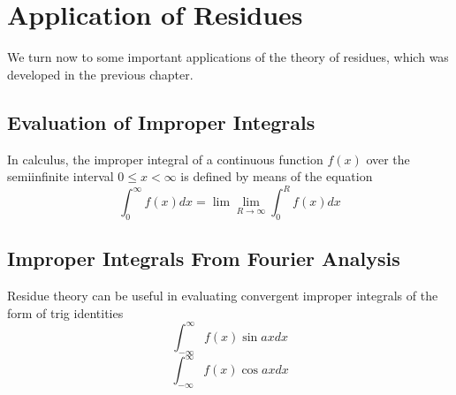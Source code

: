 \chapter{Application of Residues}
We turn now to some important applications of the theory of residues, which was
developed in the previous chapter. 
\section{Evaluation of Improper Integrals}
In calculus, the improper integral of a continuous function $ f(x) $ over the semiinfinite interval $ 0 \leq x < \infty $ is defined by means of the equation 
\[ \int_{0}^{\infty} f(x)dx = \lim\lim\limits_{R \rightarrow \infty} \int_{0}^{R} f(x) dx \]

\section{Improper Integrals From Fourier Analysis}
Residue theory can be useful in evaluating convergent improper integrals of the form of trig identities 
\[ \int_{-\infty}^{\infty} f(x) \sin ax dx \]
\[ \int_{-\infty}^{\infty} f(x) \cos ax dx \]